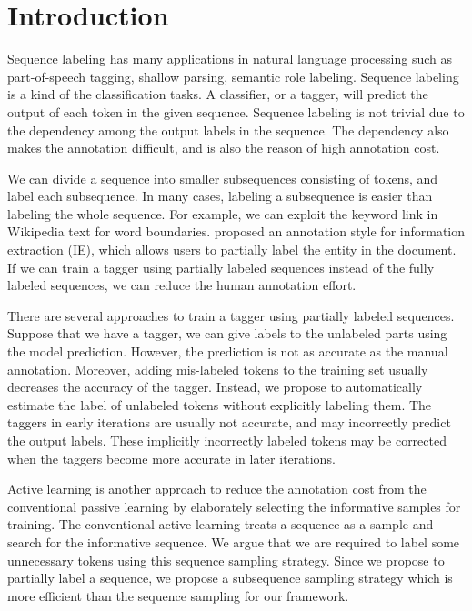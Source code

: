 \documentclass[english]{jnlp_JS2.0}
\begin{document}
\maketitle

\section{Introduction}

Sequence labeling has many applications in natural language processing such as part-of-speech tagging, shallow parsing, semantic role labeling. Sequence labeling is a kind of the classification tasks. A classifier, or a tagger, will predict the output of each token in the given sequence. Sequence labeling is not trivial due to the dependency among the output labels in the sequence. The dependency also makes the annotation difficult, and is also the reason of high annotation cost.

We can divide a sequence into smaller subsequences consisting of tokens, and label each subsequence. In many cases, labeling a subsequence is easier than labeling the whole sequence. For example, we can exploit the keyword link in Wikipedia text for word boundaries. \cite{Culotta2005} proposed an annotation style for information extraction (IE), which allows users to partially label the entity in the document. If we can train a tagger using partially labeled sequences instead of the fully labeled sequences, we can reduce the human annotation effort. 

There are several approaches to train a tagger using partially labeled sequences. Suppose that we have a tagger, we can give labels to the unlabeled parts using the model prediction. However, the prediction is not as accurate as the manual annotation. Moreover, adding mis-labeled tokens to the training set usually decreases the accuracy of the tagger. Instead, we propose to automatically estimate the label of unlabeled tokens without explicitly labeling them. The taggers in early iterations are usually not accurate, and may incorrectly predict the output labels. These implicitly incorrectly labeled tokens may be corrected when the taggers become more accurate in later iterations.

Active learning is another approach to reduce the annotation cost from the conventional passive learning by elaborately selecting the informative samples for training. The conventional active learning treats a sequence as a sample and search for the informative sequence. We argue that we are required to label some unnecessary tokens using this sequence sampling strategy. Since we propose to partially label a sequence, we propose a subsequence sampling strategy which is more efficient than the sequence sampling for our framework.
\end{document}
